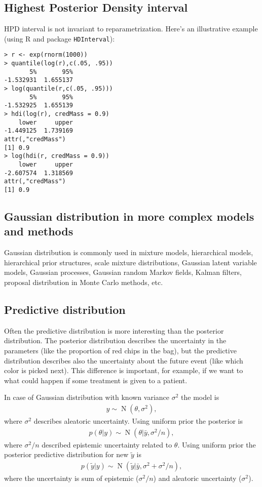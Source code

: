 \documentclass[a4paper,11pt,english]{article}
\DeclareMathOperator{\N}{N}
\begin{document}
\subsection*{Highest Posterior Density interval}

HPD interval is not invariant to reparametrization. Here's an illustrative
example (using R and package {\tt HDInterval}):
 {\small
\begin{verbatim}
> r <- exp(rnorm(1000))
> quantile(log(r),c(.05, .95))
       5%       95% 
-1.532931  1.655137 
> log(quantile(r,c(.05, .95)))
       5%       95% 
-1.532925  1.655139 
> hdi(log(r), credMass = 0.9)
    lower     upper 
-1.449125  1.739169 
attr(,"credMass")
[1] 0.9
> log(hdi(r, credMass = 0.9))
    lower     upper 
-2.607574  1.318569 
attr(,"credMass")
[1] 0.9
\end{verbatim}
}

\subsection*{Gaussian distribution in more complex models and methods}

Gaussian distribution is commonly used in mixture models, hierarchical
models, hierarchical prior structures, scale mixture distributions,
Gaussian latent variable models, Gaussian processes, Gaussian random
Markov fields, Kalman filters, proposal distribution in Monte Carlo
methods, etc.

\subsection*{Predictive distribution}

Often the predictive distribution is more interesting than the
posterior distribution. The posterior distribution describes the
uncertainty in the parameters (like the proportion of red chips in the
bag), but the predictive distribution describes also the uncertainty
about the future event (like which color is picked next). This
difference is important, for example, if we want to what could happen
if some treatment is given to a patient.

In case of Gaussian distribution with known variance $\sigma^2$ the model is
\begin{align*}
  y\sim \N(\theta,\sigma^2),
\end{align*}
where $\sigma^2$ describes aleatoric uncertainty.
Using uniform prior the posterior is 
\begin{align*}
  p(\theta|y) \sim \N(\theta|\bar{y},\sigma^2/n),
\end{align*}
where $\sigma^2/n$ described epistemic uncertainty related to $\theta$.
Using uniform prior the posterior predictive distribution for new $\tilde{y}$ is 
\begin{align*}
  p(\tilde{y}|y) \sim \N(\tilde{y}|\bar{y},\sigma^2+\sigma^2/n),
\end{align*}
where the uncertainty is sum of epistemic ($\sigma^2/n$) and aleatoric
uncertainty ($\sigma^2$).
\end{document}
